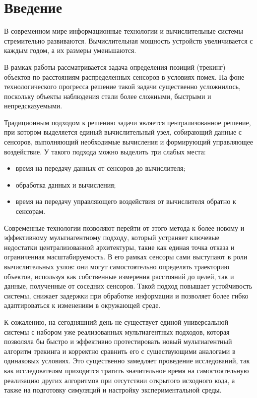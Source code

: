 
\section*{Введение}
\thispagestyle{withCompileDate}

В современном мире информационные технологии и вычислительные системы стремительно развиваются. Вычислительная мощность устройств увеличивается с каждым годом, а их размеры уменьшаются.

В рамках работы рассматривается задача определения позиций (трекинг) объектов по расстояниям распределенных сенсоров в условиях помех. На фоне технологического прогресса решение такой задачи существенно усложнилось, поскольку объекты наблюдения стали более сложными, быстрыми и непредсказуемыми.

Традиционным подходом к решению задачи является централизованное решение, при котором выделяется единый вычислительный узел, собирающий данные с сенсоров, выполняющий необходимые вычисления и формирующий управляющее воздействие. У такого подхода можно выделить три слабых места:
\begin{itemize}
    \item время на передачу данных от сенсоров до вычислителя;
    \item обработка данных и вычисления;
    \item время на передачу управляющего воздействия от вычислителя обратно к сенсорам.
\end{itemize}
Современные технологии позволяют перейти от этого метода к более новому и эффективному мультиагентному подходу, который устраняет ключевые недостатки централизованной архитектуры, такие как единая точка отказа и ограниченная масштабируемость. В его рамках сенсоры сами выступают в роли вычислительных узлов: они могут самостоятельно определять траекторию объектов, используя как собственные измерения расстояний до целей, так и данные, полученные от соседних сенсоров. Такой подход повышает устойчивость системы, снижает задержки при обработке информации и позволяет более гибко адаптироваться к изменениям в окружающей среде.

К сожалению, на сегодняшний день не существует единой универсальной системы с набором уже реализованных мультиагентных подходов, которая позволяла бы быстро и эффективно протестировать новый мультиагентный алгоритм трекинга и корректно сравнить его с существующими аналогами в одинаковых условиях. Это существенно замедляет проведение исследований, так как исследователям приходится тратить значительное время на самостоятельную реализацию других алгоритмов при отсутствии открытого исходного кода, а также на подготовку симуляций и настройку экспериментальной среды.
